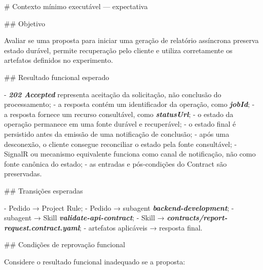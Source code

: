 \documentclass[
  10pt,
  a4paper,
  oneside]{book}
\newenvironment{Shaded}{}{}
\newcommand{\FunctionTok}[1]{\textcolor[rgb]{0.02,0.16,0.49}{#1}}
\newcommand{\InformationTok}[1]{\textcolor[rgb]{0.38,0.63,0.69}{\textbf{\textit{#1}}}}
\newcommand{\NormalTok}[1]{#1}
\newcommand{\SpecialStringTok}[1]{\textcolor[rgb]{0.73,0.40,0.53}{#1}}
\renewenvironment{Shaded}{\begin{snugshade}}{\end{snugshade}}%
\begin{document}
\begin{Shaded}
\begin{Highlighting}[]
\FunctionTok{\# Contexto mínimo executável — expectativa}

\FunctionTok{\#\# Objetivo}

\NormalTok{Avaliar se uma proposta para iniciar uma geração de relatório assíncrona preserva estado durável, permite recuperação pelo cliente e utiliza corretamente os artefatos definidos no experimento.}

\FunctionTok{\#\# Resultado funcional esperado}

\SpecialStringTok{{-} }\InformationTok{\textasciigrave{}202 Accepted\textasciigrave{}}\NormalTok{ representa aceitação da solicitação, não conclusão do processamento;}
\SpecialStringTok{{-} }\NormalTok{a resposta contém um identificador da operação, como }\InformationTok{\textasciigrave{}jobId\textasciigrave{}}\NormalTok{;}
\SpecialStringTok{{-} }\NormalTok{a resposta fornece um recurso consultável, como }\InformationTok{\textasciigrave{}statusUrl\textasciigrave{}}\NormalTok{;}
\SpecialStringTok{{-} }\NormalTok{o estado da operação permanece em uma fonte durável e recuperável;}
\SpecialStringTok{{-} }\NormalTok{o estado final é persistido antes da emissão de uma notificação de conclusão;}
\SpecialStringTok{{-} }\NormalTok{após uma desconexão, o cliente consegue reconciliar o estado pela fonte consultável;}
\SpecialStringTok{{-} }\NormalTok{SignalR ou mecanismo equivalente funciona como canal de notificação, não como fonte canônica do estado;}
\SpecialStringTok{{-} }\NormalTok{as entradas e pós{-}condições do Contract são preservadas.}

\FunctionTok{\#\# Transições esperadas}

\SpecialStringTok{{-} }\NormalTok{Pedido → Project Rule;}
\SpecialStringTok{{-} }\NormalTok{Pedido → subagent }\InformationTok{\textasciigrave{}backend{-}development\textasciigrave{}}\NormalTok{;}
\SpecialStringTok{{-} }\NormalTok{subagent → Skill }\InformationTok{\textasciigrave{}validate{-}api{-}contract\textasciigrave{}}\NormalTok{;}
\SpecialStringTok{{-} }\NormalTok{Skill → }\InformationTok{\textasciigrave{}contracts/report{-}request.contract.yaml\textasciigrave{}}\NormalTok{;}
\SpecialStringTok{{-} }\NormalTok{artefatos aplicáveis → resposta final.}

\FunctionTok{\#\# Condições de reprovação funcional}

\NormalTok{Considere o resultado funcional inadequado se a proposta:}


\end{Highlighting}
\end{Shaded}
\end{document}
